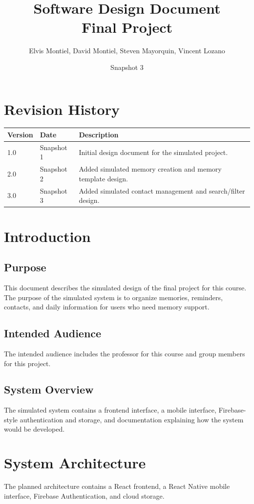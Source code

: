\documentclass{article}
\title{Software Design Document\\Final Project}
\author{Elvis Montiel, David Montiel, Steven Mayorquin, Vincent Lozano}
\date{Snapshot 3}
\begin{document}
\maketitle
\tableofcontents
\newpage

\section{Revision History}
\begin{longtable}{|p{2cm}|p{3cm}|p{8cm}|}
\hline
Version & Date & Description \\ \hline
1.0 & Snapshot 1 & Initial design document for the simulated project. \\ \hline
2.0 & Snapshot 2 & Added simulated memory creation and memory template design. \\ \hline
3.0 & Snapshot 3 & Added simulated contact management and search/filter design. \\ \hline
\end{longtable}

\section{Introduction}
\subsection{Purpose}
This document describes the simulated design of the final project for this course. The purpose of the simulated system is to organize memories, reminders, contacts, and daily information for users who need memory support.

\subsection{Intended Audience}
The intended audience includes the professor for this course and group members for this project.

\subsection{System Overview}
The simulated system contains a frontend interface, a mobile interface, Firebase-style authentication and storage, and documentation explaining how the system would be developed.

\section{System Architecture}
The planned architecture contains a React frontend, a React Native mobile interface, Firebase Authentication, and cloud storage.
\end{document}
